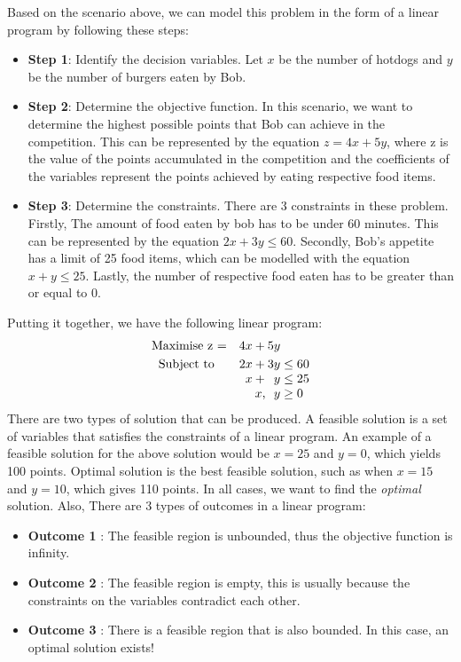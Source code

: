 Based on the scenario above, we can model this problem in the form of a linear program by following these steps:
\begin{itemize}
\item \textbf{Step 1}: Identify the decision variables. Let \(x\) be the number of hotdogs and \(y\) be the number
of burgers eaten by Bob.
\item \textbf{Step 2}: Determine the objective function. In this scenario, we want to determine the highest possible
points that Bob can achieve in the competition. This can be represented by the equation \(z = 4x + 5y\), where
z is the value of the points accumulated in the competition and the coefficients of the variables represent the points achieved by eating respective
food items.
\item \textbf{Step 3}: Determine the constraints. There are 3 constraints in these problem. Firstly, The amount of
food eaten by bob has to be under 60 minutes. This can be represented by the equation \(2x + 3y \leq 60\). Secondly,
Bob's appetite has a limit of 25 food items, which can be modelled with the equation \(x + y \leq 25\). Lastly,
the number of respective food eaten has to be greater than or equal to 0.
\end{itemize}
Putting it together, we have the following linear program:
\[
  \begin{array}{r@{}r@{}l}
    \text{Maximise z =} \quad &{}4x + 5y \\[\jot]
    \text{Subject to}\qquad &{} 2x +   3y &{} \leq 60 \\
    \qquad &{} x +   \phantom{2}y &{} \leq 25 \\
    \qquad &{} x ,   \phantom{2}y &{} \geq 0 \\
  \end{array}
\]
There are two types of solution that can be produced. A feasible solution is a set of variables that satisfies the constraints
of a linear program. An example of a feasible solution for the above solution would be \(x = 25\) and \(y=0\), which yields 100 points.
Optimal solution is the best feasible solution, such as when \(x = 15\) and \(y = 10\), which gives 110 points. In all cases, we want to
find the \textit{optimal} solution. Also, There are 3 types of outcomes in a linear program:

\begin{itemize}
\item \textbf{Outcome 1} : The feasible region is unbounded, thus the objective function is infinity.
\item \textbf{Outcome 2} : The feasible region is empty, this is usually because the constraints on the variables contradict each other.
\item \textbf{Outcome 3} : There is a feasible region that is also bounded. In this case, an optimal solution exists!
\end{itemize}

